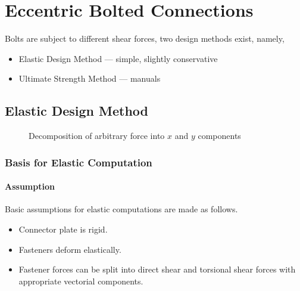 \section{Eccentric Bolted Connections}
Bolts are subject to different shear forces, two design methods exist, namely,
\begin{itemize}
\item Elastic Design Method --- simple, slightly conservative
\item Ultimate Strength Method --- manuals
\end{itemize}
\subsection{Elastic Design Method}
\begin{figure}[H]
\centering\caption{Decomposition of arbitrary force into $x$ and $y$ components}
\end{figure}
\subsubsection{Basis for Elastic Computation}
\paragraph{Assumption}
Basic assumptions for elastic computations are made as follows.
\begin{itemize}
\item Connector plate is rigid.
\item Fasteners deform elastically.
\item Fastener forces can be split into direct shear and torsional shear forces with appropriate vectorial components.
\end{itemize}
